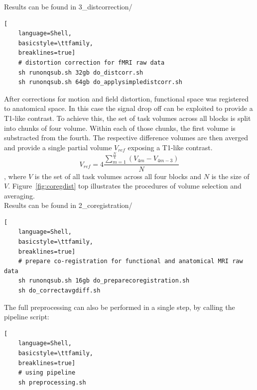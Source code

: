 \documentclass[12pt,a4paper]{scrartcl}
\begin{document}
Results can be found in 3\_distcorrection/
\begin{lstlisting}[
    language=Shell,
    basicstyle=\ttfamily,
    breaklines=true]
    # distortion correction for fMRI raw data
    sh runonqsub.sh 32gb do_distcorr.sh
    sh runonqsub.sh 64gb do_applysimpledistcorr.sh
\end{lstlisting}
After corrections for motion and field distortion, functional space was registered to anatomical space. In this case the signal drop off can be exploited to provide a T1-like contrast. To achieve this, the set of task volumes across all blocks is split into chunks of four volume. Within each of those chunks, the first volume is substracted from the fourth. The respective difference volumes are then averged and provide a single partial volume $V_{ref}$ exposing a T1-like contrast.
\begin{equation}
  V_{ref}=4\frac{\sum_{m=1}^{\frac{N}{4}}(V_{4m}-V_{4m-3})}{N}
\end{equation}
\noindent, where $V$ is the set of all task volumes across all four blocks and $N$ is the size of $V$. Figure~\ref{fig:coregdist} top illustrates the procedures of volume selection and averaging.\\
Results can be found in 2\_coregistration/
\begin{lstlisting}[
    language=Shell,
    basicstyle=\ttfamily,
    breaklines=true]
    # prepare co-registration for functional and anatomical MRI raw data
    sh runonqsub.sh 16gb do_preparecoregistration.sh
    sh do_correctavgdiff.sh
\end{lstlisting}
The full preprocessing can also be performed in a single step, by calling the pipeline script:
\begin{lstlisting}[
    language=Shell,
    basicstyle=\ttfamily,
    breaklines=true]
    # using pipeline
    sh preprocessing.sh
\end{lstlisting}
\end{document}
